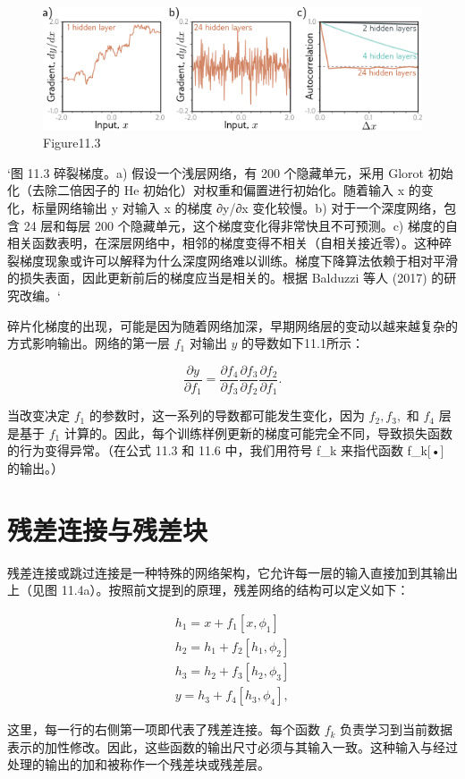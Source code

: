 \begin{figure}[h!]
\centering
\includegraphics[width=0.7\linewidth]{png/chapter11/ResidualBalduzzi.png}
\caption{Figure11.3}
\end{figure}

`图 11.3 碎裂梯度。a) 假设一个浅层网络，有 200 个隐藏单元，采用 Glorot 初始化（去除二倍因子的 He 初始化）对权重和偏置进行初始化。随着输入 x 的变化，标量网络输出 y 对输入 x 的梯度 ∂y/∂x 变化较慢。b) 对于一个深度网络，包含 24 层和每层 200 个隐藏单元，这个梯度变化得非常快且不可预测。c) 梯度的自相关函数表明，在深层网络中，相邻的梯度变得不相关（自相关接近零）。这种碎裂梯度现象或许可以解释为什么深度网络难以训练。梯度下降算法依赖于相对平滑的损失表面，因此更新前后的梯度应当是相关的。根据 Balduzzi 等人 (2017) 的研究改编。`

碎片化梯度的出现，可能是因为随着网络加深，早期网络层的变动以越来越复杂的方式影响输出。网络的第一层 \(f_1\) 对输出 \(y\) 的导数如下11.1所示：

\[
\frac{\partial y}{\partial f_1} = \frac{\partial f_4}{\partial f_3} \frac{\partial f_3}{\partial f_2} \frac{\partial f_2}{\partial f_1}. \tag{11.3}
\]

当改变决定 \(f_1\) 的参数时，这一系列的导数都可能发生变化，因为 \(f_2, f_3,\) 和 \(f_4\) 层是基于 \(f_1\) 计算的。因此，每个训练样例更新的梯度可能完全不同，导致损失函数的行为变得异常。（在公式 11.3 和 11.6 中，我们用符号 f_k 来指代函数 f_k[•] 的输出。）
\section{残差连接与残差块}
残差连接或跳过连接是一种特殊的网络架构，它允许每一层的输入直接加到其输出上（见图 11.4a）。按照前文提到的原理，残差网络的结构可以定义如下：


\begin{align}
h_1 = x + f_1[x, \phi_1] \\
h_2 = h_1 + f_2[h_1, \phi_2] \\
h_3 = h_2 + f_3[h_2, \phi_3] \\
y = h_3 + f_4[h_3, \phi_4],
\end{align} 


这里，每一行的右侧第一项即代表了残差连接。每个函数 \(f_k\) 负责学习到当前数据表示的加性修改。因此，这些函数的输出尺寸必须与其输入一致。这种输入与经过处理的输出的加和被称作一个残差块或残差层。

